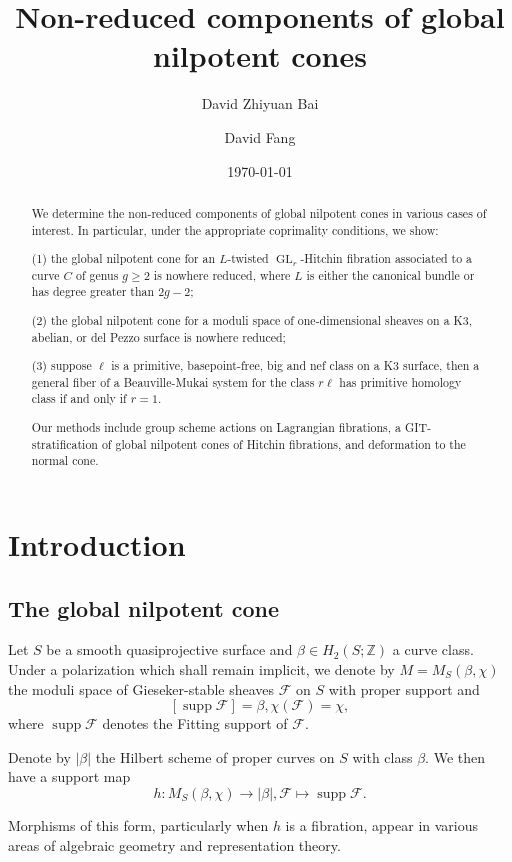 \documentclass{amsart}
\title{Non-reduced components of global nilpotent cones}
\date\today
\author{David Zhiyuan Bai}
\author{David Fang}
\theoremstyle{plain}
\theoremstyle{definition}
\theoremstyle{remark}
\begin{document}
\begin{abstract}
We determine the non-reduced components of global nilpotent cones in various cases of interest.
In particular, under the appropriate coprimality conditions, we show:

(1) the global nilpotent cone for an $L$-twisted $\operatorname{GL}_r$-Hitchin fibration associated to a curve $C$ of genus $g\ge 2$ is nowhere reduced, where $L$ is either the canonical bundle or has degree greater than $2g-2$;

(2) the global nilpotent cone for a moduli space of one-dimensional sheaves on a K3, abelian, or del Pezzo surface is nowhere reduced;

(3) suppose $\ell$ is a primitive, basepoint-free, big and nef class on a K3 surface, then a general fiber of a Beauville-Mukai system for the class $r\ell$ has primitive homology class if and only if $r=1$.

Our methods include group scheme actions on Lagrangian fibrations, a GIT-stratification of global nilpotent cones of Hitchin fibrations, and deformation to the normal cone.
\end{abstract}
\maketitle
\tableofcontents

\section{Introduction}
\subsection{The global nilpotent cone}
Let $S$ be a smooth quasiprojective surface and $\beta\in H_2(S;\mathbb Z)$ a curve class.
Under a polarization which shall remain implicit, we denote by $M=M_S(\beta,\chi)$ the moduli space of Gieseker-stable sheaves $\mathcal F$ on $S$ with proper support and
\[[\operatorname{supp}\mathcal F]=\beta,\chi(\mathcal F)=\chi,\]
where $\operatorname{supp}\mathcal F$ denotes the Fitting support of $\mathcal F$.

Denote by $|\beta|$ the Hilbert scheme of proper curves on $S$ with class $\beta$.
We then have a support map
\[h:M_S(\beta,\chi)\to|\beta|,\mathcal F\mapsto \operatorname{supp}\mathcal F.\]

Morphisms of this form, particularly when $h$ is a fibration, appear in various areas of algebraic geometry and representation theory.
\end{document}
